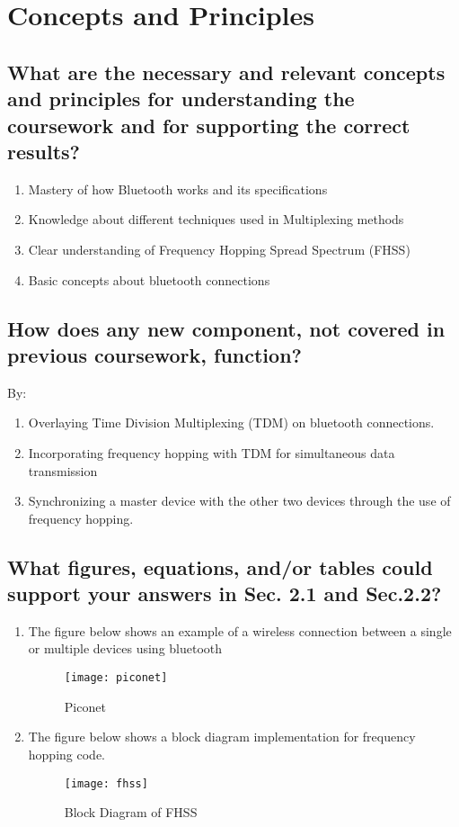 \section{Concepts and Principles}
\label{sec:concps}

\subsection{What are the necessary and relevant concepts and principles for understanding the coursework and for supporting the correct results?}
\begin{enumerate}
	\item Mastery of how Bluetooth works and its specifications
	\item Knowledge about different techniques used in Multiplexing methods
	\item Clear understanding of Frequency Hopping Spread Spectrum (FHSS)
	\item Basic concepts about bluetooth connections
	
\end{enumerate}

\subsection{How does any new component, not covered in  previous coursework, function?}
By:
\begin{enumerate}
	\item Overlaying Time Division Multiplexing (TDM) on bluetooth connections. 
	
	\item Incorporating frequency hopping with TDM for simultaneous data transmission
	
	\item Synchronizing a master device with the other two devices through the use of frequency hopping.
	
\end{enumerate}


\subsection{What figures, equations, and/or tables could support your answers in Sec. 2.1 and Sec.2.2?}
\begin{enumerate}
	\item The figure below shows an example of a wireless connection between a single or multiple devices using bluetooth
	\begin{figure}[hp]
		\centering
		\captionsetup{justification=centering,margin=2cm}
		\texttt{[image: piconet]}
		\caption{Piconet}
	\end{figure}
	\item The figure below shows a block diagram implementation for frequency hopping code.
	\begin{figure}[ht]
		\centering
		\captionsetup{justification=centering,margin=2cm}
		\texttt{[image: fhss]}
		\caption{Block Diagram of FHSS}
	\end{figure}
\end{enumerate}

